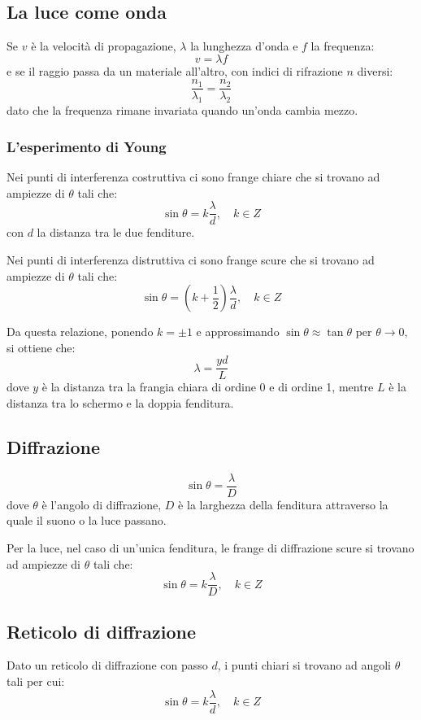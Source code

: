 \documentclass[12pt]{article}
\begin{document}
\subsection{La luce come onda}
Se $v$ è la velocità di propagazione, $\lambda$ la lunghezza d'onda e $f$ la frequenza:
$$ v = \lambda f $$
e se il raggio passa da un materiale all'altro, con indici di rifrazione $n$ diversi:
$$ \frac{n_1}{\lambda_1} = \frac{n_2}{\lambda_2} $$
dato che la frequenza rimane invariata quando un'onda cambia mezzo.

\subsubsection{L'esperimento di Young}
Nei punti di interferenza costruttiva ci sono frange chiare che si trovano ad ampiezze di $\theta$ tali che:
$$ \sin{\theta} = k\frac{\lambda}{d}, \hspace{1em} k \in Z $$
con $d$ la distanza tra le due fenditure.

\vspace{1em}

Nei punti di interferenza distruttiva ci sono frange scure che si trovano ad ampiezze di $\theta$ tali che:
$$ \sin{\theta} = (k + \frac{1}{2})\frac{\lambda}{d}, \hspace{1em} k \in Z $$

Da questa relazione, ponendo $k = \pm1$ e approssimando $\sin{\theta} \approx \tan{\theta}$ per $\theta \rightarrow 0 $, si ottiene che:
$$ \lambda = \frac{yd}{L} $$
dove $y$ è la distanza tra la frangia chiara di ordine 0 e di ordine 1, mentre $L$ è la distanza tra lo schermo e la doppia fenditura.

\subsection{Diffrazione}
$$ \sin{\theta} = \frac{\lambda}{D} $$
dove $\theta$ è l'angolo di diffrazione, $D$ è la larghezza della fenditura attraverso la quale il suono o la luce passano.

\vspace{1em}

Per la luce, nel caso di un'unica fenditura, le frange di diffrazione scure si trovano ad ampiezze di $\theta$ tali che:
$$ \sin{\theta} = k\frac{\lambda}{D}, \hspace{1em} k \in Z $$

\subsection{Reticolo di diffrazione}
Dato un reticolo di diffrazione con passo $d$, i punti chiari si trovano ad angoli $\theta$ tali per cui:
$$ \sin{\theta} = k\frac{\lambda}{d}, \hspace{1em} k \in Z $$
\end{document}
